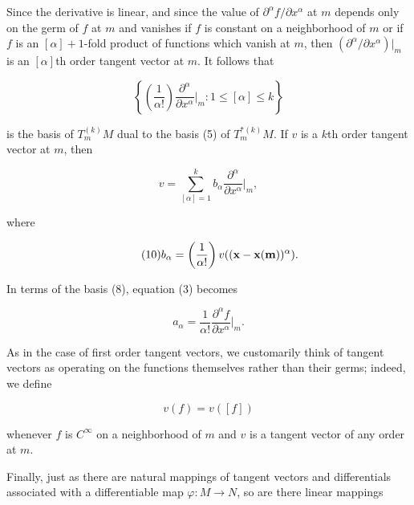Since the derivative is linear, and since the value of $\partial^{\alpha} f/\partial x^{\alpha}$ at $m$ depends only on the germ of $f$ at $m$ and vanishes if $f$ is constant on a neighborhood of $m$ or if $f$ is an $[\alpha]+1$-fold product of functions which vanish at $m$, then $(\partial^{\alpha}/\partial x^{\alpha})\big|_m$ is an $[\alpha]$th order tangent vector at $m$. It follows that

\begin{equation}
	\tag{8}\label{eq:1.26:8}
	\left\{\left(\frac{1}{\alpha!}\right)\frac{\partial^{\alpha}}{\partial x^{\alpha}}\bigg|_{m}:1\leq[\alpha]\leq k\right\}
\end{equation}

is the basis of $T_{m}^{(k)} M$ dual to the basis (5) of $T_{m}^{*(k)} M$. If $v$ is a $k$th order tangent vector at $m$, then

\begin{equation}
	\tag{9}\label{eq:1.26:9}
	v=\sum_{[\alpha]=1}^{k}b_{\alpha}\frac{\partial^{\alpha}}{\partial x^{\alpha}}\bigg|_{m},
\end{equation}

where

\begin{equation}
	\tag{10}\label{eq:1.26:10}
	b_{\alpha}=\left(\frac{1}{\alpha!}\right)v(({\bf x}-{\bf x}({\bf m}))^{\alpha}).
\end{equation}

In terms of the basis (8), equation (3) becomes

\begin{equation}
	\tag{11}\label{eq:1.26:11}
	a_{\alpha}=\frac{1}{\alpha!}\frac{\partial^{\alpha}f}{\partial x^{\alpha}}\bigg|_{m}.
\end{equation}

As in the case of first order tangent vectors, we customarily think of tangent vectors as operating on the functions themselves rather than their germs; indeed, we define

\begin{equation}
	\tag{12}\label{eq:1.26:12}
	v(f)=v([f])
\end{equation}

whenever $f$ is $C^{\infty}$ on a neighborhood of $m$ and $v$ is a tangent vector of any order at $m$.

Finally, just as there are natural mappings of tangent vectors and differentials associated with a differentiable map $\varphi\colon M\to N$, so are there linear mappings

